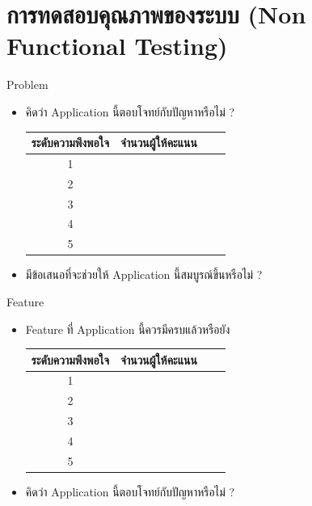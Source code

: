\documentclass[14pt,oneside,openright,a4paper]{cpe-thai-project}
\begin{document}
  \section{การทดสอบคุณภาพของระบบ (Non Functional Testing)}
Problem
\begin{itemize}
  \item คิดว่า Application นี้ตอบโจทย์กับปัญหาหรือไม่ ?
  \begin{table}[!h]
    \centering
    \captionsetup{justification=centering} %
    \begin{tabular}{|c|c|c|c|}
      \hline
      \multicolumn{1}{|c|}{\cellcolor[HTML]{9FC5E8}ระดับความพึงพอใจ} &
        \multicolumn{1}{c|}{\cellcolor[HTML]{9FC5E8}จำนวนผู้ให้คะแนน} \\ \hline
       1 & 
         \\ \hline 
       2 & 
         \\ \hline 
       3 & 
         \\ \hline 
       4 & 
         \\ \hline 
       5 & 
         \\ \hline
    \end{tabular}
    \label{tab:Problemssolvingsatisfaction}
  \end{table}
  \item มีข้อเสนอที่จะช่วยให้ Application นี้สมบูรณ์ขึ้นหรือไม่ ?
\end{itemize}
  Feature
\begin{itemize}
  \item Feature ที่ Application นี้ควรมีครบแล้วหรือยัง
  \begin{table}[!h]
    \centering
    \captionsetup{justification=centering} %
    \begin{tabular}{|c|c|c|c|}
      \hline
      \multicolumn{1}{|c|}{\cellcolor[HTML]{9FC5E8}ระดับความพึงพอใจ} &
        \multicolumn{1}{c|}{\cellcolor[HTML]{9FC5E8}จำนวนผู้ให้คะแนน} \\ \hline
       1 & 
         \\ \hline 
       2 & 
         \\ \hline 
       3 & 
         \\ \hline 
       4 & 
         \\ \hline 
       5 & 
         \\ \hline
    \end{tabular}
    \label{tab:Featuresatisfaction}
  \end{table}
  \item คิดว่า Application นี้ตอบโจทย์กับปัญหาหรือไม่ ?
\end{itemize}
\end{document}
